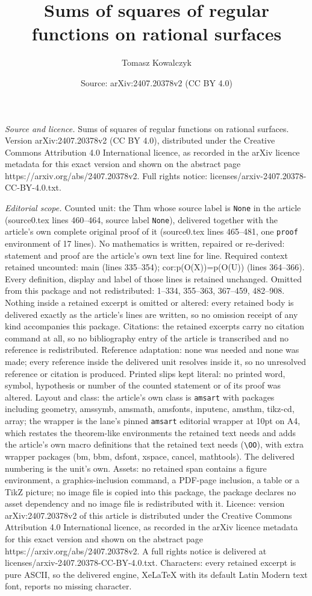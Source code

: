 \documentclass[10pt,a4paper]{amsart}
\title[Sums of squares of regular functions on rational surfaces]{Sums of squares of regular functions on rational surfaces}
\author{Tomasz Kowalczyk}
\date{Source: arXiv:2407.20378v2 (CC BY 4.0)}
\begin{document}
\maketitle

\noindent\emph{Source and licence.} Sums of squares of regular functions on rational surfaces. Version arXiv:2407.20378v2 (CC BY 4.0), distributed under the Creative Commons Attribution 4.0 International licence, as recorded in the arXiv licence metadata for this exact version and shown on the abstract page https://arxiv.org/abs/2407.20378v2. Full rights notice: licenses/arxiv-2407.20378-CC-BY-4.0.txt.\par\smallskip

\noindent\textit{Editorial scope.} Counted unit: the Thm whose source label is \texttt{None} in the article (source0.tex lines 460--464, source label \texttt{None}), delivered together with the article's own complete original proof of it (source0.tex lines 465--481, one \texttt{proof} environment of 17 lines). No mathematics is written, repaired or re-derived: statement and proof are the article's own text line for line. Required context retained uncounted: main (lines 335--354); cor:p(O(X))=p(O(U)) (lines 364--366). Every definition, display and label of those lines is retained unchanged. Omitted from this package and not redistributed: 1--334, 355--363, 367--459, 482--908. Nothing inside a retained excerpt is omitted or altered: every retained body is delivered exactly as the article's lines are written, so no omission receipt of any kind accompanies this package. Citations: the retained excerpts carry no citation command at all, so no bibliography entry of the article is transcribed and no reference is redistributed. Reference adaptation: none was needed and none was made; every reference inside the delivered unit resolves inside it, so no unresolved reference or citation is produced. Printed slips kept literal: no printed word, symbol, hypothesis or number of the counted statement or of its proof was altered. Layout and class: the article's own class is \texttt{amsart} with packages including geometry, amssymb, amsmath, amsfonts, inputenc, amsthm, tikz-cd, array; the wrapper is the lane's pinned \texttt{amsart} editorial wrapper at 10pt on A4, which restates the theorem-like environments the retained text needs and adds the article's own macro definitions that the retained text needs (\texttt{\textbackslash OO}), with extra wrapper packages (bm, bbm, dsfont, xspace, cancel, mathtools). The delivered numbering is the unit's own. Assets: no retained span contains a figure environment, a graphics-inclusion command, a PDF-page inclusion, a table or a TikZ picture; no image file is copied into this package, the package declares no asset dependency and no image file is redistributed with it. Licence: version arXiv:2407.20378v2 of this article is distributed under the Creative Commons Attribution 4.0 International licence, as recorded in the arXiv licence metadata for this exact version and shown on the abstract page https://arxiv.org/abs/2407.20378v2. A full rights notice is delivered at licenses/arxiv-2407.20378-CC-BY-4.0.txt. Characters: every retained excerpt is pure ASCII, so the delivered engine, XeLaTeX with its default Latin Modern text font, reports no missing character.
\end{document}
